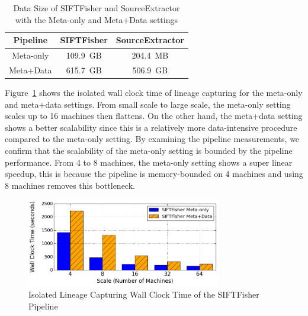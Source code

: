 \documentclass{sig-alternate}
\begin{document}
\begin{table}[t]
\begin{center}
    \caption{Data Size of SIFTFisher and SourceExtractor with the Meta-only and Meta+Data settings}
    \begin{scriptsize}
    \begin{tabular}{ | c | c | c| }
    \hline
    Pipeline & SIFTFisher & SourceExtractor \\ \hline \hline
    Meta-only & 109.9~GB & 204.4~MB \\ \hline
    Meta+Data & 615.7~GB & 506.9~GB \\ \hline
    \end{tabular}
    \end{scriptsize}
    \label{tb:apps-stats}
\end{center}   
\end{table}

Figure~\ref{fig:VOC-overhead} shows the isolated wall clock time of lineage capturing for the meta-only and meta+data
settings. From small scale to large scale, the meta-only setting scales up to 16 machines then flattens. 
On the other hand, the meta+data setting shows a better scalability since this is a relatively more
data-intensive procedure compared to the meta-only setting. 
By examining the pipeline measurements, we confirm that the scalability of the meta-only setting is bounded
by the pipeline performance.
From 4 to 8 machines, the meta-only setting shows a super linear speedup, this is because the pipeline is memory-bounded on 4 machines
and using 8 machines removes this bottleneck.

\begin{figure}[t]
\begin{center}
    \includegraphics[width=85mm]{pictures/Overhead-Time-VOC}
\caption {Isolated Lineage Capturing Wall Clock Time of the SIFTFisher Pipeline
    \label{fig:VOC-overhead}
}
\end{center}
\end{figure}
\end{document}
